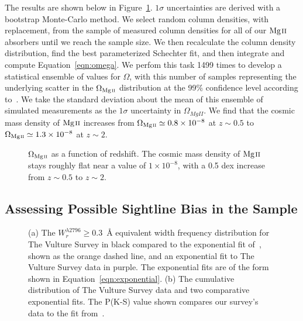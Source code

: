The results are shown below in Figure~\ref{fig:omegamgii}. $1\sigma$ uncertainties are derived with a bootstrap Monte-Carlo method. We select random column densities, with replacement, from the sample of measured column densities for all of our ${\hbox{{\rm Mg}\kern 0.1em{\sc ii}}}$ absorbers until we reach the sample size. We then recalculate the column density distribution, find the best parameterized Schechter fit, and then integrate and compute Equation~\ref{eqn:omega}. We perfom this task 1499 times to develop a statistical ensemble of values for $\Omega$, with this number of samples representing the underlying scatter in the $\Omega_{\hbox{\scriptsize {\hbox{{\rm Mg}\kern 0.1em{\sc ii}}}}}$ distribution at the 99\% confidence level according to~\cite{Davidson2000bootstrap}. We take the standard deviation about the mean of this ensemble of simulated measurements as the $1\sigma$ uncertainty in $\Omega_{MgII}$. We find that the cosmic mass density of ${\hbox{{\rm Mg}\kern 0.1em{\sc ii}}}$ increases from $\Omega_{\hbox{\scriptsize {\hbox{{\rm Mg}\kern 0.1em{\sc ii}}}}} \simeq 0.8\times10^{-8}$ at $z \sim 0.5$ to $\Omega_{\hbox{\scriptsize {\hbox{{\rm Mg}\kern 0.1em{\sc ii}}}}} \simeq 1.3\times10^{-8}$ at $z \sim 2$.

\begin{figure}[bth]
\caption{$\Omega_{\hbox{\scriptsize {\hbox{{\rm Mg}\kern 0.1em{\sc ii}}}}}$ as a function of redshift. The cosmic mass density of ${\hbox{{\rm Mg}\kern 0.1em{\sc ii}}}$ stays roughly flat near a value of $1 \times 10^{-8}$, with a 0.5 dex increase from $z \sim 0.5$ to $z \sim 2$.}
\label{fig:omegamgii}
\end{figure}

\subsection{Assessing Possible Sightline Bias in the {\MgII} Sample}
\label{ch5:bias}

\begin{figure*}[bth]
\caption{(a) The $W_r^{\lambda2796} \ge 0.3$~{\AA} equivalent width frequency distribution for The Vulture Survey in black compared to the exponential fit of~\cite{Nestor2005}, shown as the orange dashed line, and an exponential fit to The Vulture Survey data in purple. The exponential fits are of the form shown in Equation~\ref{eqn:exponential}. (b) The cumulative distribution of The Vulture Survey data and two comparative exponential fits. The P(K-S) value shown compares our survey's data to the fit from~\cite{Nestor2005}. }
\label{fig:bias}
\end{figure*}

